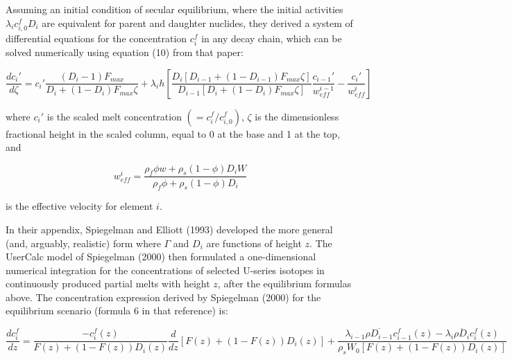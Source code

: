 \documentclass[draft]{agujournal2019}
\begin{document}
Assuming an initial condition of secular equilibrium, where the initial activities $\lambda_i c_{i,0}^f D_i$ are equivalent for parent and daughter nuclides, they derived a system of differential equations for the concentration $c_i^f$ in any decay chain, which can be solved numerically using equation (10) from that paper:

\begin{linenomath*}
\begin{equation}
    \frac{dc_i'}{d\zeta} = c_i' \frac{(D_i-1)F_{max}}{D_i + (1-D_i)F_{max} \zeta} + \lambda_i h\left[ \frac{D_i[D_{i-1}+(1-D_{i-1})F_{max}\zeta]}{D_{i-1}[D_i + (1-D_i)F_{max}\zeta]} \frac{c_{i-1}'}{w_{eff}^{i-1}} - \frac{c_i'}{w_{eff}^i}\right]\label{eq:4}
\end{equation}
\end{linenomath*}

where $c_i'$ is the scaled melt concentration $(= c_i^f/c_{i,0}^f)$, $\zeta$ is the dimensionless fractional height in the scaled column, equal to 0 at the base and 1 at the top, and

\begin{linenomath*}
\begin{equation}
    w_{eff}^i = \frac{\rho_f \phi w + \rho_s(1-\phi)D_i W}{\rho_f \phi + \rho_s(1-\phi)D_i}\label{eq:5}
\end{equation}
\end{linenomath*}

is the effective velocity for element $i$.

In their appendix, Spiegelman and Elliott (1993) developed the more general (and, arguably, realistic) form where $\Gamma$ and $D_i$ are functions of height $z$. The UserCalc model of Spiegelman (2000) then formulated a one-dimensional numerical integration for the concentrations of selected U-series isotopes in continuously produced partial melts with height $z$, after the equilibrium formulas above. The concentration expression derived by Spiegelman (2000) for the equilibrium scenario (formula 6 in that reference) is:

\begin{linenomath*}
\begin{equation}
    \frac{dc_i^f}{dz} = \frac{-c_i^f(z)}{F(z) + (1 - F(z)) D_i(z)} \frac{d}{dz} [F(z) + (1 - F(z)) D_i(z)] + \frac{\lambda_{i-1}\overline{\rho D_{i-1}} c_{i-1}^f(z) - \lambda_{i}\overline{\rho D_{i}} c_{i}^f(z)}{\rho_s W_0 [F(z) + (1 - F(z)) D_i(z)]}\label{eq:6}
\end{equation}
\end{linenomath*}
\end{document}
